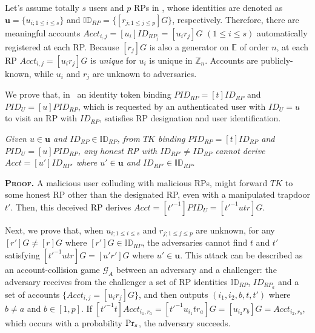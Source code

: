 
Let's assume totally $s$ users and $p$ RPs in \usso,
    whose identities are denoted as $\mathbf{u} = \{u_{i; 1 \leq i \leq s}\}$ and $\mathbb{ID}_{RP} = \{[r_{j;1 \leq j \leq p}]G\}$, respectively.
Therefore, there are meaningful accounts $Acct_{i,j}=[u_i]ID_{RP_j} = [u_i r_j]G$ $(1 \leq i \leq s)$ automatically registered at each RP.
Because $[r_j]G$ is also a generator on $\mathbb{E}$ of order $n$,
    at each RP $Acct_{i,j}=[u_i r_j]G$ is \emph{unique} for $u_i$ is unique in $\mathbb{Z}_n$.
Accounts are publicly-known, while $u_{i}$ and $r_{j}$ are unknown to adversaries.

We prove that, in \usso\ 
an identity token binding $PID_{RP} = [t]ID_{RP}$ and $PID_U = [u]PID_{RP}$, which is requested by an authenticated user with $ID_U =u$ to visit an RP with $ID_{RP}$,
    satisfies RP designation and user identification.

\vspace{-1mm}
\begin{thm}[RP Designation]
\emph{Given $u \in \mathbf{u}$ and $ID_{RP} \in \mathbb{ID}_{RP}$,
from $TK$ binding $PID_{RP}=[t]ID_{RP}$ and $PID_U = [u]PID_{RP}$,
    any honest RP with ${ID_{RP'} \neq ID_{RP}}$ cannot derive $Acct = [u']ID_{RP'}$ where $u' \in \mathbf{u}$ and $ID_{RP'} \in \mathbb{ID}_{RP}$.}\label{thm-rp-designation}
\end{thm}
\vspace{-1mm}

\noindent\textbf{\textsc{Proof.}} 
A malicious user colluding with malicious RPs,
    might forward $TK$ to some honest RP other than the designated RP,
        even with a manipulated trapdoor $t'$.
Then, this deceived RP derives $Acct = [t'^{-1}]PID_U = [t'^{-1}utr]G$.

Next, we prove that, when $u_{i; 1\leq i \leq s}$ and $r_{j; 1\leq j \leq p}$ are unknown,
    for any $[r']G \neq [r]G$ where $[r']G \in \mathbb{ID}_{RP}$,
    the adversaries cannot find $t$ and $t'$ satisfying $[t'^{-1}utr]G = [u'r']G$ where $u' \in \mathbf{u}$.
This attack can be described as an account-collision game $\mathcal{G}_A$ between an adversary and a challenger:
 the adversary receives from the challenger a set of RP identities $\mathbb{ID}_{RP}$,
  $ID_{RP_{a}}$ and a set of accounts $\{Acct_{i,j}= [u_ir_j]G\}$,
 and then outputs $(i_1, i_2, b, t, t')$ where $b \neq a$ and $b \in [1,p]$.
If $[t'^{-1}t]Acct_{i_1,r_a} = [t'^{-1}u_{i_1}tr_{a}]G = [u_{i_2}r_{b}]G = Acct_{i_2,r_b}$, which occurs with a probability ${\rm Pr}_s$, the adversary succeeds.

